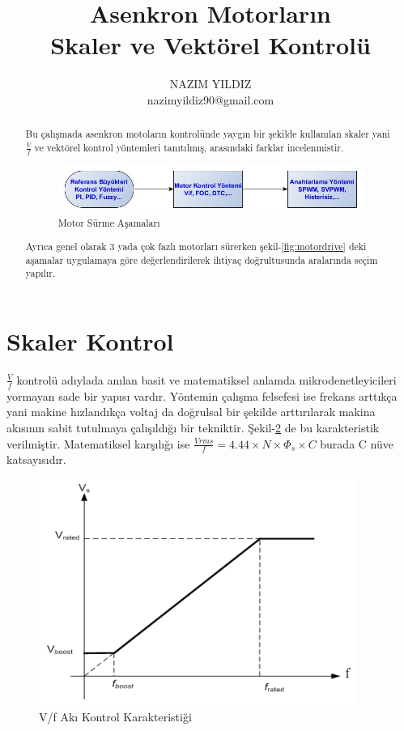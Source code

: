 \documentclass[10pt,a4paper]{article}
\title{Asenkron Motorların \\ 
	\large \vspace*{-10pt} Skaler ve Vektörel Kontrolü\vspace*{10pt}}
\author{%
	NAZIM YILDIZ \\
	nazimyildiz90@gmail.com \\
	\vspace{20pt}
}
\makeatletter
\def\printtitle{%
	{\color{bl} \centering \huge \sc \textbf{\@title}\par}}		%
\def\printauthor{%
	{\centering \small \@author}}				%
\makeatother
\begin{document}
	\printtitle 
	
	\printauthor
	
	\begin{abstract}
		Bu çalışmada asenkron motoların kontrolünde yaygın bir şekilde kullanılan skaler yani 
		$\frac{V}{f}$ ve vektörel kontrol yöntemleri tanıtılmış, arasındaki farklar incelenmistir.
		
			\begin{figure}[hp]
				\centering	
				\shorthandoff{=}
				\includegraphics[width=1.0\linewidth]{MotorKontrolDiyagram.jpg}
				\shorthandon{=}	
				\caption{Motor Sürme Aşamaları}
				\label{fig:motordrive}
			\end{figure}
			
			Ayrıca genel olarak 3 yada çok fazlı motorları sürerken şekil-\ref{fig:motordrive} deki aşamalar uygulamaya göre değerlendirilerek ihtiyaç doğrultusunda aralarında seçim yapılır.
	\end{abstract}
	
	\section{Skaler Kontrol}
	$\frac{V}{f}$ kontrolü adıylada anılan basit ve matematiksel anlamda mikrodenetleyicileri yormayan sade bir yapısı vardır.
	Yöntemin çalışma felsefesi ise frekans arttıkça yani makine hızlandıkça voltaj da doğrulsal bir şekilde arttırılarak makina akısının sabit tutulmaya çalışıldığı bir tekniktir. Şekil-\ref{fig:vf_kar} de bu karakteristik verilmiştir. Matematiksel karşılığı ise $\frac{Vrms}{f} = 4.44 \times N \times {\Phi_s} \times C$ burada C nüve katsayısıdır.\newline

	\begin{figure}[hp]
		\centering	
		\shorthandoff{=}
		\includegraphics[width=0.7\linewidth]{vf_grafigi.png}
		\shorthandon{=}	
		\caption{V/f Akı Kontrol Karakteristiği}
		\label{fig:vf_kar}
	\end{figure}
	
\end{document}
